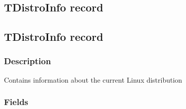 \documentclass{report}
\begin{document}
\subsection*{\large{\textbf{TDistroInfo record}}\normalsize\hspace{1ex}\hrulefill}
\else
\subsection*{TDistroInfo record}
\fi
\label{distri.TDistroInfo}
\subsubsection*{\large{\textbf{Description}}\normalsize\hspace{1ex}\hfill}
Contains information about the current Linux distribution\subsubsection*{\large{\textbf{Fields}}\normalsize\hspace{1ex}\hfill}
\end{document}
